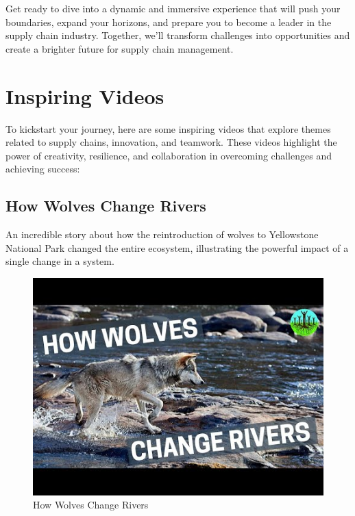 \documentclass[
  letterpaper,
  DIV=11,
  numbers=noendperiod]{scrreprt}
\begin{document}
Get ready to dive into a dynamic and immersive experience that will push
your boundaries, expand your horizons, and prepare you to become a
leader in the supply chain industry. Together, we'll transform
challenges into opportunities and create a brighter future for supply
chain management.

\section{Inspiring Videos}\label{inspiring-videos}

To kickstart your journey, here are some inspiring videos that explore
themes related to supply chains, innovation, and teamwork. These videos
highlight the power of creativity, resilience, and collaboration in
overcoming challenges and achieving success:

\subsection{How Wolves Change Rivers}\label{how-wolves-change-rivers}

An incredible story about how the reintroduction of wolves to
Yellowstone National Park changed the entire ecosystem, illustrating the
powerful impact of a single change in a system.

\begin{figure}[H]

{\centering \includegraphics{index_files/mediabag/0.jpg}

}

\caption{How Wolves Change Rivers}

\end{figure}%
\end{document}

